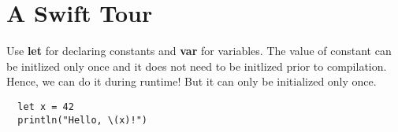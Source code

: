 \section*{A Swift Tour}
Use \textbf{let} for declaring constants and \textbf{var} for variables. The value of constant
can be initlized only once and it does not need to be initlized prior to compilation. Hence, we can
do it during runtime! But it can only be initialized only once.

\begin{verbatim}
  let x = 42
  println("Hello, \(x)!")
\end{verbatim}